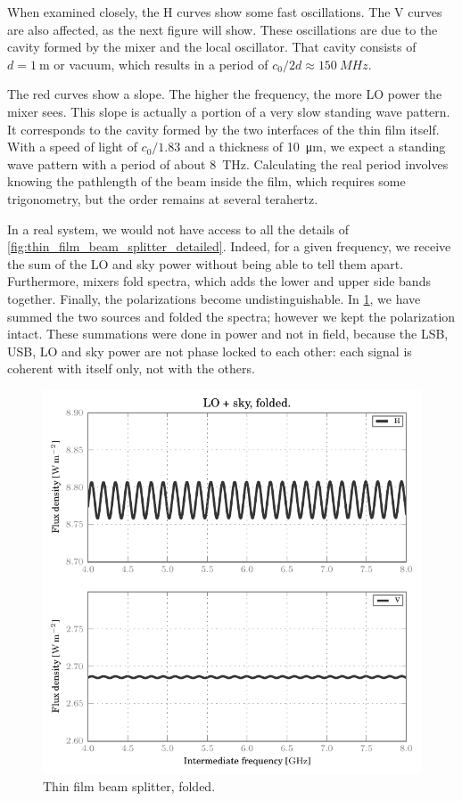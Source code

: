 When examined closely, the H curves show some fast oscillations.
The V curves are also affected, as the next figure will show.
These oscillations are due to the cavity formed by the mixer and the local oscillator.
That cavity consists of $d=\SI{1}{\meter}$ or vacuum, which results in a period of $c_0 / 2d \approx \SI{150}{MHz}$.

The red curves show a slope.
The higher the frequency, the more LO power the mixer sees.
This slope is actually a portion of a very slow standing wave pattern.
It corresponds to the cavity formed by the two interfaces of the thin film itself.
With a speed of light of $c_0 / 1.83$ and a thickness of \SI{10}{\micro\meter}, we expect a standing wave pattern with a period of about \SI{8}{\tera\hertz}.
Calculating the real period involves knowing the pathlength of the beam inside the film, which requires some trigonometry, but the order remains at several terahertz.

In a real system, we would not have access to all the details of \cref{fig:thin_film_beam_splitter_detailed}.
Indeed, for a given frequency, we receive the sum of the LO and sky power without being able to tell them apart.
Furthermore, mixers fold spectra, which adds the lower and upper side bands together.
Finally, the polarizations become undistinguishable.
In \cref{fig:thin_film_beam_splitter_folded}, we have summed the two sources and folded the spectra; however we kept the polarization intact.
These summations were done in power and not in field, because the LSB, USB, LO and sky power are not phase locked to each other: each signal is coherent with itself only, not with the others.

\begin{figure}[hbtp]
    \centering
    \includegraphics{thin_film_beam_splitter_folded}
    \caption{Thin film beam splitter, folded.}
    \label{fig:thin_film_beam_splitter_folded}
\end{figure}

